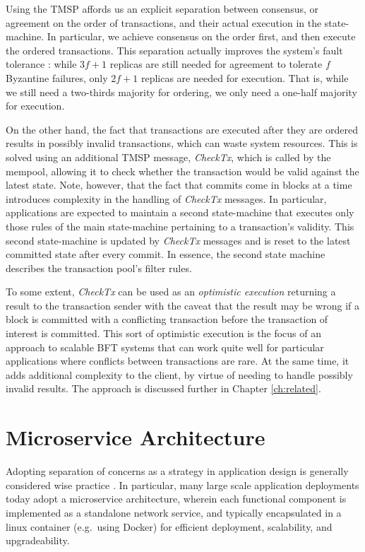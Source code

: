Using the TMSP affords us an explicit separation between consensus, or agreement on the order of transactions, 
and their actual execution in the state-machine.
In particular, we achieve consensus on the order first, and then execute the ordered transactions.
This separation actually improves the system's fault tolerance \cite{yin2003separating}:
while $3f+1$ replicas are still needed for agreement to tolerate $f$ Byzantine failures, 
only $2f+1$ replicas are needed for execution.
That is, while we still need a two-thirds majority for ordering, we only need a one-half majority for execution.

On the other hand, the fact that transactions are executed after they are ordered results in possibly invalid transactions,
which can waste system resources. 
This is solved using an additional TMSP message, \emph{CheckTx}, which is called by the mempool,
allowing it to check whether the transaction would be valid against the latest state.
Note, however, that the fact that commits come in blocks at a time introduces complexity in the handling of \emph{CheckTx} messages.
In particular, applications are expected to maintain a second state-machine that executes only those rules of the main state-machine pertaining to a transaction's validity. 
This second state-machine is updated by \emph{CheckTx} messages and is reset to the latest committed state after every commit.
In essence, the second state machine describes the transaction pool's filter rules.

To some extent, \emph{CheckTx} can be used as an \emph{optimistic execution} 
returning a result to the transaction sender with the caveat that 
the result may be wrong if a block is committed with a conflicting transaction
before the transaction of interest is committed.
This sort of optimistic execution is the focus of an approach to scalable BFT systems 
that can work quite well for particular applications where conflicts between transactions are rare. 
At the same time, it adds additional complexity to the client, by virtue of needing to handle possibly invalid results.
The approach is discussed further in Chapter \ref{ch:related}.

\section{Microservice Architecture}

Adopting separation of concerns as a strategy in application design is generally considered wise practice \cite{hursch1995separation}.
In particular, many large scale application deployments today adopt a microservice architecture,
wherein each functional component is implemented as a standalone network service, 
and typically encapsulated in a linux container (e.g.~using Docker) for efficient deployment, scalability, and upgradeability.

